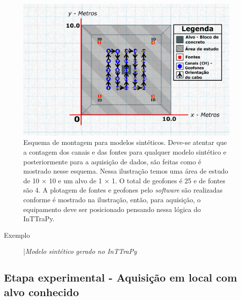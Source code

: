 \documentclass[a4paper, 12 pt]{article} %
\begin{document}
\begin{figure}[!hbtp]
	\begin{center}
		\includegraphics[scale=0.65]{Figuras/geometria.png}
	\end{center}
	\caption{Esquema de montagem para modelos sintéticos. Deve-se atentar que a contagem dos canais e das fontes para qualquer modelo sintético e posteriormente para a aquisição de dados, são feitas como é mostrado nesse esquema. Nessa ilustração temos uma área de estudo de 10 $\times$ 10 e um alvo de 1 $\times$ 1. O total de geofones é 25 e de fontes são 4. A plotagem de fontes e geofones pelo \textit{software} são realizadas conforme é mostrado na ilustração, então, para aquisição, o equipamento deve ser posicionado pensando nessa lógica do InTTraPy.}
	\label{montagem_geometria}
\end{figure} \newpage

\begin{description}
	\item[Exemplo] |\textit{Modelo sintético gerado no InTTraPy} 
	
	\hspace{0.5cm} \blindtext 
	
\end{description}


\subsection{Etapa experimental - Aquisição em local com alvo conhecido}

\blindtext 
%
\blindtext 
%
\blindtext

\end{document}
